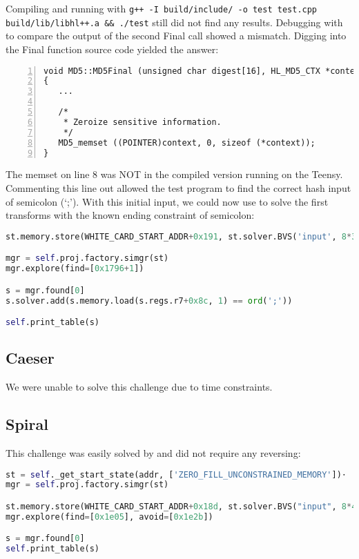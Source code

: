 Compiling and running with \texttt{g++ -I build/include/ -o test test.cpp build/lib/libhl++.a \&\& ./test} still did not find any results. Debugging with \angr to compare the output of the second Final call showed a mismatch. Digging into the Final function source code yielded the answer:

\begin{lstlisting}[numbers=left,xleftmargin=1em]
void MD5::MD5Final (unsigned char digest[16], HL_MD5_CTX *context)
{
   ...

   /*
    * Zeroize sensitive information.
    */
   MD5_memset ((POINTER)context, 0, sizeof (*context));
}
\end{lstlisting}

The memset on line 8 was NOT in the compiled version running on the Teensy. Commenting this line out allowed the test program to find the correct hash input of semicolon (`;'). With this initial input, we could now use \angr to solve the first transforms with the known ending constraint of semicolon:

\begin{lstlisting}[language=python]
st.memory.store(WHITE_CARD_START_ADDR+0x191, st.solver.BVS('input', 8*3))

mgr = self.proj.factory.simgr(st)
mgr.explore(find=[0x1796+1])

s = mgr.found[0]
s.solver.add(s.memory.load(s.regs.r7+0x8c, 1) == ord(';'))

self.print_table(s)
\end{lstlisting}

\subsection{Caeser}
We were unable to solve this challenge due to time constraints.

\subsection{Spiral}
This challenge was easily solved by \angr and did not require any reversing:

\begin{lstlisting}[language=python]
st = self._get_start_state(addr, ['ZERO_FILL_UNCONSTRAINED_MEMORY'])⋅
mgr = self.proj.factory.simgr(st)

st.memory.store(WHITE_CARD_START_ADDR+0x18d, st.solver.BVS("input", 8*4))
mgr.explore(find=[0x1e05], avoid=[0x1e2b])

s = mgr.found[0]
self.print_table(s)
\end{lstlisting}

